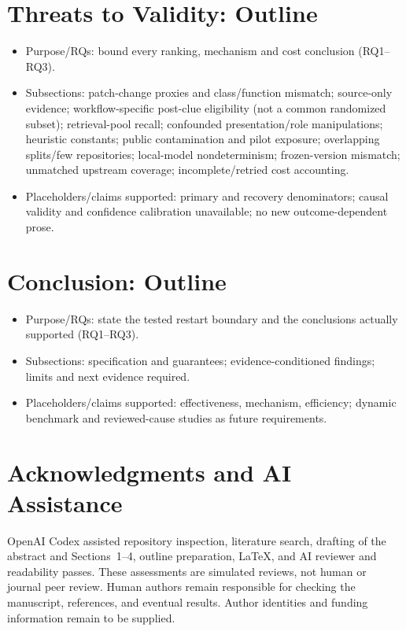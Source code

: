 \documentclass[letterpaper,journal]{IEEEtran}
\begin{document}
\section{Threats to Validity: Outline}
\begin{itemize}
\item Purpose/RQs: bound every ranking, mechanism and cost conclusion (RQ1--RQ3).
\item Subsections: patch-change proxies and class/function mismatch; source-only evidence; workflow-specific post-clue eligibility (not a common randomized subset); retrieval-pool recall; confounded presentation/role manipulations; heuristic constants; public contamination and pilot exposure; overlapping splits/few repositories; local-model nondeterminism; frozen-version mismatch; unmatched upstream coverage; incomplete/retried cost accounting.
\item Placeholders/claims supported: primary and recovery denominators; causal validity and confidence calibration unavailable; no new outcome-dependent prose.
\end{itemize}

\section{Conclusion: Outline}
\begin{itemize}
\item Purpose/RQs: state the tested restart boundary and the conclusions actually supported (RQ1--RQ3).
\item Subsections: specification and guarantees; evidence-conditioned findings; limits and next evidence required.
\item Placeholders/claims supported: effectiveness, mechanism, efficiency; dynamic benchmark and reviewed-cause studies as future requirements.
\end{itemize}

\section*{Acknowledgments and AI Assistance}
OpenAI Codex assisted repository inspection, literature search, drafting of the abstract and Sections~1--4, outline preparation, LaTeX, and AI reviewer and readability passes. These assessments are simulated reviews, not human or journal peer review. Human authors remain responsible for checking the manuscript, references, and eventual results. Author identities and funding information remain to be supplied.



\end{document}
